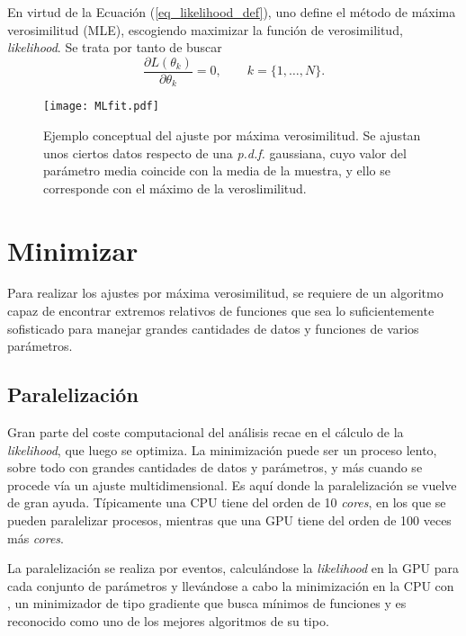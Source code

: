 En virtud de la Ecuación (\ref{eq_likelihood_def}), 
uno define el método de máxima verosimilitud (MLE), escogiendo maximizar la función de verosimilitud, \emph{likelihood}. Se trata por tanto de buscar
\begin{equation}
	\frac{\partial L(\theta_k)}{\partial \theta_k} = 0, \qquad k=\{1,\dots,N\}.
\end{equation}

\begin{figure}[H]
\centering
\texttt{[image: MLfit.pdf]}
\caption{Ejemplo conceptual del ajuste por máxima verosimilitud. Se ajustan unos ciertos datos respecto de una \textit{p.d.f.} gaussiana, cuyo valor del parámetro media coincide con la media de la muestra, y ello se corresponde con el máximo de la veroslimilitud.} \label{fig_maxloglikeexp}
\end{figure}	






\section{Minimizar}

Para realizar los ajustes por máxima verosimilitud, se requiere de un algoritmo capaz de encontrar extremos relativos de funciones que sea lo suficientemente sofisticado para manejar grandes cantidades de datos y funciones de varios parámetros. 


\subsection{Paralelización}



\color{dieg}
Gran parte del coste computacional  del análisis recae en el cálculo de la \emph{likelihood}, que luego se optimiza.  
%
La minimización puede ser un proceso lento, sobre todo con grandes cantidades de datos y parámetros, y más cuando se procede vía un ajuste multidimensional. Es aquí donde la paralelización se vuelve de gran ayuda. Típicamente una CPU tiene del orden de 10 \textit{cores}, en los que se pueden paralelizar procesos, mientras que una GPU tiene del orden de 100 veces más \textit{cores}. 

La paralelización se realiza por eventos, calculándose la \emph{likelihood} en la GPU para cada conjunto de parámetros y llevándose a cabo la minimización en la CPU con \minuit \cite{James:1975dr},  un minimizador de tipo gradiente que busca mínimos de funciones y es reconocido como uno de los mejores algoritmos de su tipo. 
\color{norm}

